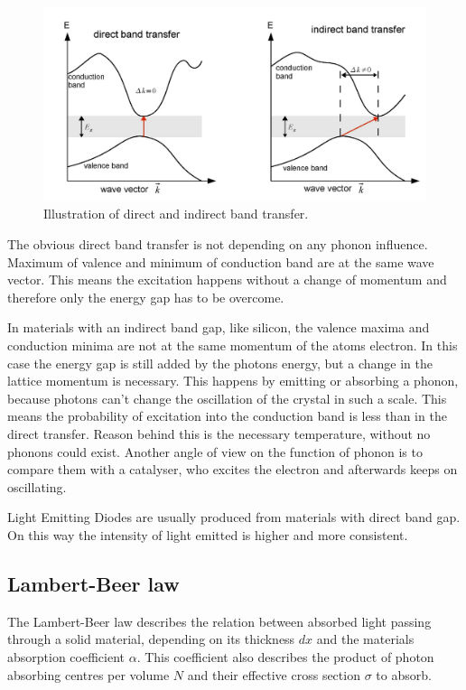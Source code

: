 \documentclass[]{article}
\begin{document}
\begin{figure}[H]
\centering
\includegraphics[width=.8\textwidth]{Plots/transfer.png}
\caption{Illustration of direct and indirect band transfer. \cite{wiki}}
\label{fig:band transfer}
\end{figure}

The obvious direct band transfer is not depending on any phonon influence. Maximum of valence and minimum of conduction band are at the same wave vector. This means the excitation happens without a change of momentum and therefore only the energy gap has to be overcome. 

In materials with an indirect band gap, like silicon, the valence maxima and conduction minima are not at the same momentum of the atoms electron. In this case the energy gap is still added by the photons energy, but a change in the lattice momentum is necessary. This happens by emitting or absorbing a phonon, because photons can't change the oscillation of the crystal in such a scale. This means the probability of excitation into the conduction band is less than in the direct transfer. Reason behind this is the necessary temperature, without no phonons could exist. Another angle of view on the function of phonon is to compare them with a catalyser, who excites the electron and afterwards keeps on oscillating. 


Light Emitting Diodes are usually produced from materials with direct band gap. On this way the intensity of light emitted is higher and more consistent.

\subsection{Lambert-Beer law}
The Lambert-Beer law describes the relation between absorbed light passing through a solid material, depending on its thickness $dx$ and the materials absorption coefficient $\alpha$. This coefficient also describes the   product of photon absorbing centres per volume $N$ and their effective cross section $\sigma$ to absorb. 
\end{document}
